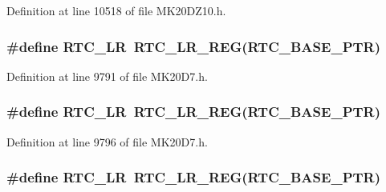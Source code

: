 Definition at line 10518 of file M\+K20\+D\+Z10.\+h.

\subsubsection[{\texorpdfstring{R\+T\+C\+\_\+\+LR}{RTC_LR}}]{\setlength{\rightskip}{0pt plus 5cm}\#define R\+T\+C\+\_\+\+LR~{\bf R\+T\+C\+\_\+\+L\+R\+\_\+\+R\+EG}({\bf R\+T\+C\+\_\+\+B\+A\+S\+E\+\_\+\+P\+TR})}\hypertarget{group___r_t_c___register___accessor___macros_ga05e64891d0c59b705c0f96db04496416}{}\label{group___r_t_c___register___accessor___macros_ga05e64891d0c59b705c0f96db04496416}


Definition at line 9791 of file M\+K20\+D7.\+h.

\subsubsection[{\texorpdfstring{R\+T\+C\+\_\+\+LR}{RTC_LR}}]{\setlength{\rightskip}{0pt plus 5cm}\#define R\+T\+C\+\_\+\+LR~{\bf R\+T\+C\+\_\+\+L\+R\+\_\+\+R\+EG}({\bf R\+T\+C\+\_\+\+B\+A\+S\+E\+\_\+\+P\+TR})}\hypertarget{group___r_t_c___register___accessor___macros_ga05e64891d0c59b705c0f96db04496416}{}\label{group___r_t_c___register___accessor___macros_ga05e64891d0c59b705c0f96db04496416}


Definition at line 9796 of file M\+K20\+D7.\+h.

\subsubsection[{\texorpdfstring{R\+T\+C\+\_\+\+LR}{RTC_LR}}]{\setlength{\rightskip}{0pt plus 5cm}\#define R\+T\+C\+\_\+\+LR~{\bf R\+T\+C\+\_\+\+L\+R\+\_\+\+R\+EG}({\bf R\+T\+C\+\_\+\+B\+A\+S\+E\+\_\+\+P\+TR})}\hypertarget{group___r_t_c___register___accessor___macros_ga05e64891d0c59b705c0f96db04496416}{}\label{group___r_t_c___register___accessor___macros_ga05e64891d0c59b705c0f96db04496416}



